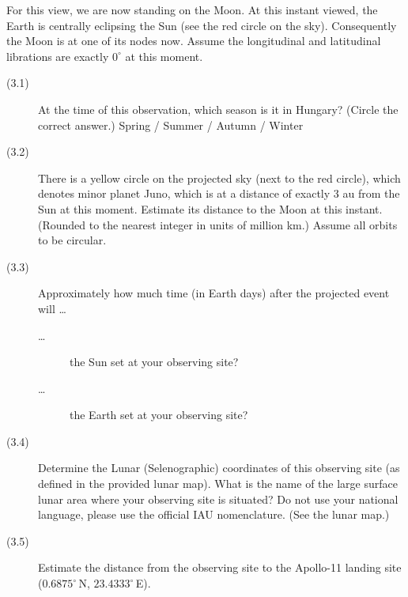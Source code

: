 For this view, we are now standing on the Moon. At this instant viewed, the
Earth is centrally eclipsing the Sun (see the red circle on the sky).
Consequently the Moon is at one of its nodes now. Assume the longitudinal
and latitudinal librations are exactly $0^\circ$ at this moment.

\begin{description}
\item[(3.1)] At the time of this observation, which season is it in Hungary?
  (Circle the correct answer.) Spring / Summer / Autumn / Winter
\item[(3.2)] There is a yellow circle on the projected sky (next to the red
  circle), which denotes minor planet Juno, which is at a distance of
  exactly 3 au from the Sun at this moment. Estimate its distance to the
  Moon at this instant. (Rounded to the nearest integer in units of million
  km.) Assume all orbits to be circular.
\item[(3.3)] Approximately how much time (in Earth days) after the projected
  event will \ldots
  \begin{description}
  \item[\rm\ldots] the Sun set at your observing site?
  \item[\rm\ldots] the Earth set at your observing site?
  \end{description}
\item[(3.4)] Determine the Lunar (Selenographic) coordinates of this
  observing site (as defined in the provided lunar map). What is the name of
  the large surface lunar area where your observing site is situated? Do not
  use your national language, please use the official IAU nomenclature. (See
  the lunar map.)
\item[(3.5)] Estimate the distance from the observing site to the Apollo-11
  landing site ($0.6875^\circ$\,N, $23.4333^\circ$\,E).
\end{description}

